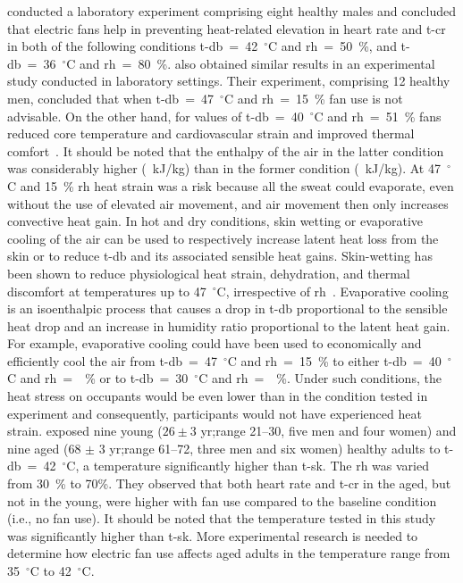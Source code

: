  conducted a laboratory experiment comprising eight healthy males and concluded that electric fans help in preventing heat-related elevation in heart rate and \ac{t-cr} in both of the following conditions \ac{t-db}~=~42~$^{\circ}$C and \ac{rh}~=~50~\%, and \ac{t-db}~=~36~$^{\circ}$C and \ac{rh}~=~80~\%.
 also obtained similar results in an experimental study conducted in laboratory settings.
Their experiment, comprising 12 healthy men, concluded that when \ac{t-db}~=~47~$^{\circ}$C and \ac{rh}~=~15~\% fan use is not advisable.
On the other hand, for values of \ac{t-db}~=~40~$^{\circ}$C and \ac{rh}~=~51~\% fans reduced core temperature and cardiovascular strain and improved thermal comfort~\cite{Morris2019}.
It should be noted that the enthalpy of the air in the latter condition was considerably higher (~kJ/kg) than in the former condition (~kJ/kg).
At 47~$^{\circ}$C and 15~\% \ac{rh} heat strain was a risk because all the sweat could evaporate, even without the use of elevated air movement, and air movement then only increases convective heat gain.
In hot and dry conditions, skin wetting or evaporative cooling of the air can be used to respectively increase latent heat loss from the skin or to reduce \ac{t-db} and its associated sensible heat gains.
Skin-wetting has been shown to reduce physiological heat strain, dehydration, and thermal discomfort at temperatures up to 47~$^{\circ}$C, irrespective of \ac{rh}~\cite{Morris2019a}.
Evaporative cooling is an isoenthalpic process that causes a drop in \ac{t-db} proportional to the sensible heat drop and an increase in humidity ratio proportional to the latent heat gain.
For example, evaporative cooling could have been used to economically and efficiently cool the air from \ac{t-db}~=~47~$^{\circ}$C and \ac{rh}~=~15~\% to either \ac{t-db}~=~40~$^{\circ}$C and \ac{rh}~=~~\% or to \ac{t-db}~=~30~$^{\circ}$C and \ac{rh}~=~~\%\@.
Under such conditions, the heat stress on occupants would be even lower than in the condition tested in  experiment and consequently, participants would not have experienced heat strain.
 exposed nine young ($26 \pm 3$ yr;\@ range 21--30, five men and four women) and nine aged (68 $\pm$ 3 yr;\@ range 61--72, three men and six women) healthy adults to \ac{t-db}~=~42~$^{\circ}$C, a temperature significantly higher than \ac{t-sk}.
The \ac{rh} was varied from 30~\% to 70\%.
They observed that both heart rate and \ac{t-cr} in the aged, but not in the young, were higher with fan use compared to the baseline condition (i.e., no fan use).
It should be noted that the temperature tested in this study was significantly higher than \ac{t-sk}.
More experimental research is needed to determine how electric fan use affects aged adults in the temperature range from 35~$^{\circ}$C to 42~$^{\circ}$C\@.

